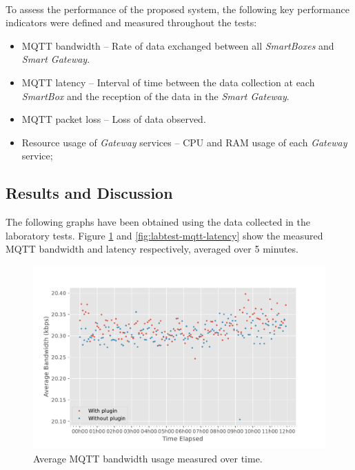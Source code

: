 \paragraph{} To assess the performance of the proposed system, the following key performance indicators were defined and measured throughout the tests:

\begin{itemize} 
    \item \acs{MQTT} bandwidth -- Rate of data exchanged between all \textit{SmartBoxes} and \textit{Smart Gateway}.
    \item \acs{MQTT} latency -- Interval of time between the data collection at each \textit{SmartBox} and the reception of the data in the \textit{Smart Gateway}.
    \item \acs{MQTT} packet loss -- Loss of data observed.
    \item Resource usage of \textit{Gateway} services -- \acs{CPU} and \acs{RAM} usage of each \textit{Gateway} service;
\end{itemize}


\subsection{Results and Discussion}

The following graphs have been obtained using the data collected in the laboratory tests. Figure \ref{fig:labtest-mqtt-bandwidth} and \ref{fig:labtest-mqtt-latency} show the measured \acs{MQTT} bandwidth and latency respectively, averaged over 5 minutes. 

\begin{figure}[H]
    \centering
    \includegraphics[width=0.85\linewidth]{images/labtest_mqtt_bandwidth.pdf}
    \caption{Average \acs{MQTT} bandwidth usage measured over time.}
    \label{fig:labtest-mqtt-bandwidth}
\end{figure}

